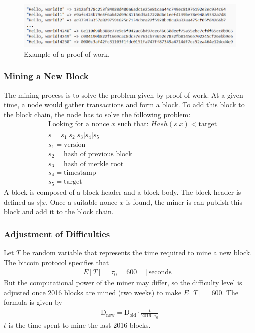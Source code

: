 \documentclass[12pt,a4paper]{article}
\begin{document}
\begin{figure}[tbph!]
	\centering
	\includegraphics[width=0.9\linewidth]{Hash}
	\caption{Example of a proof of work. \cite{1}}
	\label{fig:hash}
\end{figure}

\subsubsection{Mining a New Block}
The mining process is to solve the problem given by proof of work. At a given time, a node would gather transactions and form a block. To add this block to the block chain, the node has to solve the following problem:
\begin{align*}
&\text{Looking for a nonce $x$ such that: } Hash(s|x) < \text{target}\\
&s = s_1 | s_2 | s_3 | s_4 | s_5\\
&s_1 = \text{version}\\
&s_2 = \text{hash of previous block}\\
&s_3 = \text{hash of merkle root}\\
&s_4 = \text{timestamp }\\
&s_5 = \text{target}
\end{align*}
A block is composed of a block header and a block body. The block header is defined as $s|x$. Once a suitable nonce $x$ is found, the miner is can publish this block and add it to the block chain.
\subsubsection{Adjustment of Difficulties}
Let $T$ be random variable that represents the time required to mine a new block. The bitcoin protocol specifies that 
\begin{align*}
E[T] = \tau_0 = 600 \quad [\text{seconds}]
\end{align*}
But the computational power of the miner may differ, so the difficulty level is adjusted once 2016 blocks are mined (two weeks) to make $E[T] = 600 $. The formula is given by 
\begin{align*}
\text{D}_{\text{new}} = \text{D}_{\text{old}} \cdot \frac{t}{2016\cdot \tau_0}
\end{align*}
$t$ is the time spent to mine the last 2016 blocks. 
\end{document}
